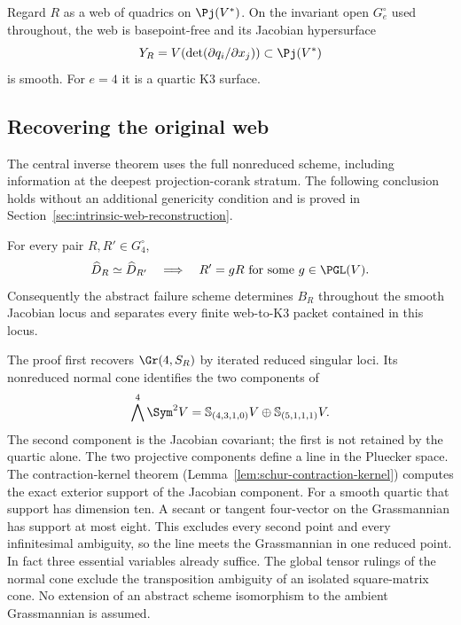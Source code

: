 Regard \(R\) as a web of quadrics on \(\Pj(V^*)\).  On the
invariant open \(G_e^\circ\) used throughout, the web is
basepoint-free and its Jacobian hypersurface
\begin{equation}\label{eq:Y-intro}
 Y_R=V\!\left(\det(\partial q_i/\partial x_j)\right)
 \subset\Pj(V^*)
\end{equation}
is smooth.  For \(e=4\) it is a quartic K3 surface.


\subsection{Recovering the original web}

The central inverse theorem uses the full nonreduced scheme,
including information at the deepest projection-corank stratum.  The
following conclusion holds without an additional genericity condition
and is proved in
Section~\ref{sec:intrinsic-web-reconstruction}.

\begin{theorem}
\label{thm:main-web-reconstruction}
For every pair \(R,R'\in G_4^\circ\),
\[
 \widehat D_R\simeq\widehat D_{R'}\quad\Longrightarrow\quad
 R'=gR\ \text{for some }g\in\PGL(V).
\]
Consequently the abstract failure scheme determines \(B_R\)
throughout the smooth Jacobian locus and separates every finite
web-to-K3 packet contained in this locus.
\end{theorem}

The proof first recovers \(\Gr(4,S_R)\) by iterated reduced
singular loci.  Its nonreduced normal cone identifies the two
components of
\[
 \bigwedge^4\Sym^2V=
 \mathbb S_{(4,3,1,0)}V\oplus\mathbb S_{(5,1,1,1)}V.
\]
The second component is the Jacobian covariant; the first is not
retained by the quartic alone.  The two projective components define a
line in the Pluecker space.  The contraction-kernel theorem
(Lemma~\ref{lem:schur-contraction-kernel}) computes the exact exterior
support of the Jacobian component.  For a smooth quartic that support
has dimension ten.  A secant or tangent four-vector on the Grassmannian
has support at most eight.  This excludes every second point and every
infinitesimal ambiguity, so the line meets the Grassmannian in one
reduced point.  In fact three essential variables already suffice.  The global tensor rulings of the normal cone
exclude the transposition ambiguity of an isolated square-matrix
cone.  No extension of an abstract scheme isomorphism to the ambient
Grassmannian is assumed.



